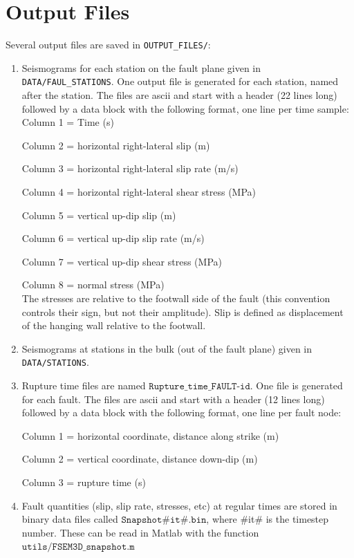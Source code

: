 \section{Output Files }

Several output files are saved in \texttt{OUTPUT\_FILES/}:\\

\begin{enumerate}
\item Seismograms for each station on the fault plane given in \texttt{DATA/FAUL\_STATIONS}.
One output file is generated for each station, named after the station.
The files are ascii and start with a header (22 lines long) followed
by a data block with the following format, one line per time sample:\\



Column 1 = Time (s)


Column 2 = horizontal right-lateral slip (m)


Column 3 = horizontal right-lateral slip rate (m/s)


Column 4 = horizontal right-lateral shear stress (MPa)


Column 5 = vertical up-dip slip (m)


Column 6 = vertical up-dip slip rate (m/s)


Column 7 = vertical up-dip shear stress (MPa)


Column 8 = normal stress (MPa)\\



The stresses are relative to the footwall side of the fault (this
convention controls their sign, but not their amplitude). Slip is
defined as displacement of the hanging wall relative to the footwall.

\item Seismograms at stations in the bulk (out of the fault plane) given
in \texttt{DATA/STATIONS}.
\item Rupture time files are named $\mathtt{Rupture\_time\_FAULT}$-$\mathtt{id}$.
One file is generated for each fault. The files are ascii and start
with a header (12 lines long) followed by a data block with the following
format, one line per fault node:


Column 1 = horizontal coordinate, distance along strike (m)


Column 2 = vertical coordinate, distance down-dip (m)


Column 3 = rupture time (s)

\item Fault quantities (slip, slip rate, stresses, etc) at regular times
are stored in binary data files called $\mathtt{Snapshot\#it\#.bin}$,
where \#it\# is the timestep number. These can be read in Matlab with
the function $\mathtt{utils/FSEM3D\_snapshot.m}$
\end{enumerate}

